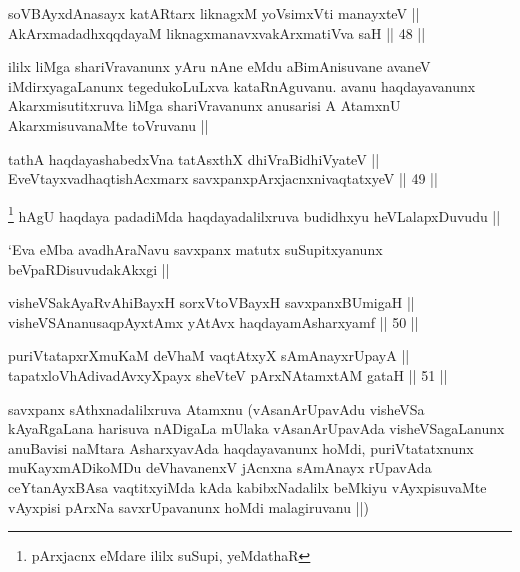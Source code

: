 
\begin{shl}
soV\s BAyxdAnasayx katAR\s tarx liknagxM yoV\s simxVti manayxteV || \\
AkArxmadadhxqqdayaM liknagxmanavxvakArxmatiVva saH ||  48 ||  
\end{shl}

\begin{artha}
ililx liMga shariVravanunx yAru nAne eMdu aBimAnisuvane avaneV
iMdirxyagaLanunx tegedukoLuLxva kataRnAguvanu. avanu haqdayavanunx
Akarxmisutitxruva liMga shariVravanunx anusarisi A AtamxnU
AkarxmisuvanaMte toVruvanu ||
\end{artha}


\begin{shl}
tathA haqdayashabedxVna tatAsxthX dhiVraBidhiVyateV || \\
EveVtayxvadhaqtishAcxmarx savxpanxpArxjacnxnivaqtatxyeV ||  49 ||  
\end{shl}

\begin{artha}
\footnote{pArxjacnx eMdare ililx suSupi, yeMdathaR}
hAgU haqdaya padadiMda haqdayadalilxruva budidhxyu heVLalapxDuvudu ||
\end{artha}

\begin{artha}
`Eva eMba avadhAraNavu savxpanx matutx suSupitxyanunx
  beVpaRDisuvudakAkxgi ||
\end{artha}


\begin{shl}
visheVSakAyaRvAhiBayxH sorxVtoVBayxH savxpanxBUmigaH || \\
visheVSAnanusaqpAyx\s \s tAmx yAtAvx haqdayamAsharxyamf ||  50 || 
\end{shl}
				
\begin{shl}
puriVtatapxrXmuKaM deVhaM vaqtAtxyX sAmAnayxrUpayA || \\
tapatxloVhAdivadAvxyXpayx sheVteV pArxNAtamxtAM gataH ||  51 ||  
\end{shl}

\begin{artha}
savxpanx sAthxnadalilxruva Atamxnu (vAsanArUpavAdu visheVSa
kAyaRgaLana harisuva nADigaLa mUlaka vAsanArUpavAda visheVSagaLanunx
anuBavisi naMtara AsharxyavAda haqdayavanunx hoMdi, puriVtatatxnunx
muKayxmADikoMDu deVhavanenxV jAcnxna sAmAnayx rUpavAda ceYtanAyxBAsa
vaqtitxyiMda kAda kabibxNadalilx beMkiyu vAyxpisuvaMte vAyxpisi pArxNa
savxrUpavanunx hoMdi malagiruvanu ||)
\end{artha}

